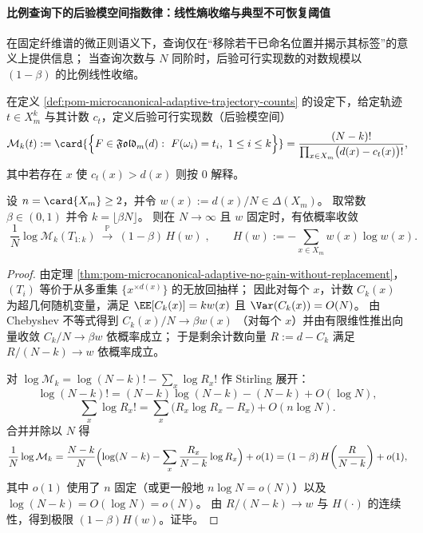 \paragraph{比例查询下的后验模空间指数律：线性熵收缩与典型不可恢复阈值}
在固定纤维谱的微正则语义下，查询仅在“移除若干已命名位置并揭示其标签”的意义上提供信息；
当查询次数与 \(N\) 同阶时，后验可行实现数的对数规模以 \((1-\beta)\) 的比例线性收缩。

\begin{definition}[比例查询的后验模空间规模]\label{def:pom-microcanonical-posterior-moduli-size-beta}
在定义 \ref{def:pom-microcanonical-adaptive-trajectory-counts} 的设定下，给定轨迹 \(t\in X_m^k\) 与其计数 \(c_t\)，定义后验可行实现数（后验模空间）
\[
\mathcal{M}_k(t)
:=\card{\Bigl\{F\in\mathfrak{Fold}_m(d):\ F(\omega_i)=t_i,\ 1\le i\le k\Bigr\}}
=\frac{(N-k)!}{\prod_{x\in X_m}\bigl(d(x)-c_t(x)\bigr)!},
\]
其中若存在 \(x\) 使 \(c_t(x)>d(x)\) 则按 \(0\) 解释。
\end{definition}

\begin{theorem}\label{thm:pom-microcanonical-posterior-entropy-linear-law}
设 \(n=\card{X_m}\ge 2\)，并令 \(w(x):=d(x)/N\in\Delta(X_m)\)。
取常数 \(\beta\in(0,1)\) 并令 \(k=\lfloor \beta N\rfloor\)。
则在 \(N\to\infty\) 且 \(w\) 固定时，有依概率收敛
\[
\boxed{\;
\frac{1}{N}\log \mathcal{M}_k(T_{1:k})
\ \xrightarrow{\ \mathbb{P}\ }\ (1-\beta)\,H(w)\;},
\qquad
H(w):=-\sum_{x\in X_m}w(x)\log w(x).
\]
\end{theorem}
\begin{proof}
由定理 \ref{thm:pom-microcanonical-adaptive-no-gain-without-replacement}，
\((T_i)\) 等价于从多重集 \(\{x^{\times d(x)}\}\) 的无放回抽样；
因此对每个 \(x\)，计数 \(C_k(x)\) 为超几何随机变量，满足
\(
\EE[C_k(x)]=kw(x)
\)
且 \(\Var(C_k(x))=O(N)\)。
由 Chebyshev 不等式得到
\(
C_k(x)/N\to \beta w(x)
\)
（对每个 \(x\)）并由有限维性推出向量收敛 \(C_k/N\to \beta w\) 依概率成立；
于是剩余计数向量
\(
R:=d-C_k
\)
满足
\(
R/(N-k)\to w
\)
依概率成立。
\par
对 \(\log\mathcal{M}_k=\log(N-k)!-\sum_x\log R_x!\) 作 Stirling 展开：
\[
\log (N-k)!
=(N-k)\log(N-k)-(N-k)+O(\log N),
\]
\[
\sum_x\log R_x!
=\sum_x\bigl(R_x\log R_x-R_x\bigr)+O(n\log N).
\]
合并并除以 \(N\) 得
\[
\frac{1}{N}\log\mathcal{M}_k
=\frac{N-k}{N}\Bigl(\log(N-k)-\sum_x \frac{R_x}{N-k}\log R_x\Bigr)+o(1)
=(1-\beta)\,H\!\left(\frac{R}{N-k}\right)+o(1),
\]
其中 \(o(1)\) 使用了 \(n\) 固定（或更一般地 \(n\log N=o(N)\)）以及 \(\log(N-k)=O(\log N)=o(N)\)。
由 \(R/(N-k)\to w\) 与 \(H(\cdot)\) 的连续性，得到极限 \((1-\beta)H(w)\)。证毕。
\end{proof}

